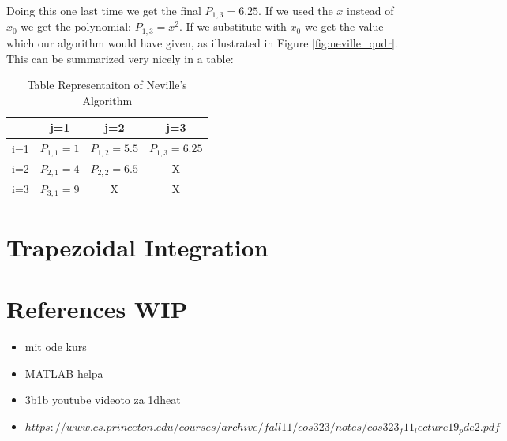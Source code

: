 \documentclass{article}
\begin{document}
\newpage
Doing this one last time we get the final $P_{1, 3} = 6.25$.
If we used the $x$ instead of $x_0$ we get the polynomial: $P_{1, 3} = x^2$. If we substitute with $x_0$
we get the value which our algorithm would have given, as illustrated in Figure \ref{fig:neville_qudr}.
This can be summarized very nicely in a table: \\
\begin{table}[H]
    \centering
    \begin{tabular}{|c|c|c|c|}
        \hline 
        &j=1&j=2&j=3\\ \hline
    i=1&$P_{1, 1} = 1$&$P_{1, 2} = 5.5$&$P_{1, 3} = 6.25$ \\
    i=2&$P_{2, 1} = 4$ & $P_{2, 2} = 6.5$ & X \\
    i=3&$P_{3, 1} = 9$ & X & X \\   
    \hline 
    \end{tabular} 
    \caption{Table Representaiton of Neville's Algorithm}   
    \label{table:neville_tbl}
\end{table}




\section{Trapezoidal Integration}

\section{References WIP}
\begin{itemize}
    \item mit ode kurs
    \item MATLAB helpa
    \item 3b1b youtube videoto za 1dheat
    \item $https://www.cs.princeton.edu/courses/archive/fall11/cos323/notes/cos323_f11_lecture19_pde2.pdf$
\end{itemize}
\end{document}
